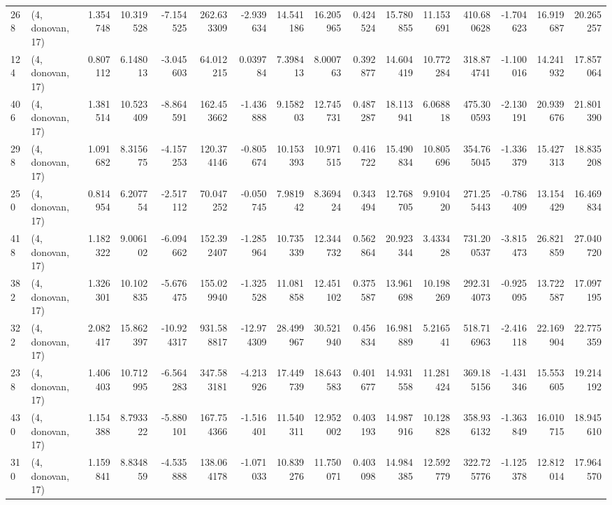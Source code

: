 \begin{tabular}{llrrrrrrrrrrrrrr}
268 &  (4, donovan, 17) &   1.354748 &  10.319528 &  -7.154525 &   262.633309 &  -2.939634 &  14.541186 &  16.205965 &  0.424524 &  15.780855 &  11.153691 &   410.680628 & -1.704623 &  16.919687 &  20.265257 \\
124 &  (4, donovan, 17) &   0.807112 &   6.148013 &  -3.045603 &    64.012215 &   0.039784 &   7.398413 &   8.000763 &  0.392877 &  14.604419 &  10.772284 &   318.874741 & -1.100016 &  14.241932 &  17.857064 \\
406 &  (4, donovan, 17) &   1.381514 &  10.523409 &  -8.864591 &   162.453662 &  -1.436888 &   9.158203 &  12.745731 &  0.487287 &  18.113941 &   6.068818 &   475.300593 & -2.130191 &  20.939676 &  21.801390 \\
298 &  (4, donovan, 17) &   1.091682 &   8.315675 &  -4.157253 &   120.374146 &  -0.805674 &  10.153393 &  10.971515 &  0.416722 &  15.490834 &  10.805696 &   354.765045 & -1.336379 &  15.427313 &  18.835208 \\
250 &  (4, donovan, 17) &   0.814954 &   6.207754 &  -2.517112 &    70.047252 &  -0.050745 &   7.981942 &   8.369424 &  0.343494 &  12.768705 &   9.910420 &   271.255443 & -0.786409 &  13.154429 &  16.469834 \\
418 &  (4, donovan, 17) &   1.182322 &   9.006102 &  -6.094662 &   152.392407 &  -1.285964 &  10.735339 &  12.344732 &  0.562864 &  20.923344 &   3.433428 &   731.200537 & -3.815473 &  26.821859 &  27.040720 \\
382 &  (4, donovan, 17) &   1.326301 &  10.102835 &  -5.676475 &   155.029940 &  -1.325528 &  11.081858 &  12.451102 &  0.375587 &  13.961698 &  10.198269 &   292.314073 & -0.925095 &  13.722587 &  17.097195 \\
322 &  (4, donovan, 17) &   2.082417 &  15.862397 & -10.924317 &   931.588817 & -12.974309 &  28.499967 &  30.521940 &  0.456834 &  16.981889 &   5.216541 &   518.716963 & -2.416118 &  22.169904 &  22.775359 \\
238 &  (4, donovan, 17) &   1.406403 &  10.712995 &  -6.564283 &   347.583181 &  -4.213926 &  17.449739 &  18.643583 &  0.401677 &  14.931558 &  11.281424 &   369.185156 & -1.431346 &  15.553605 &  19.214192 \\
430 &  (4, donovan, 17) &   1.154388 &   8.793322 &  -5.880101 &   167.754366 &  -1.516401 &  11.540311 &  12.952002 &  0.403193 &  14.987916 &  10.128828 &   358.936132 & -1.363849 &  16.010715 &  18.945610 \\
310 &  (4, donovan, 17) &   1.159841 &   8.834859 &  -4.535888 &   138.064178 &  -1.071033 &  10.839276 &  11.750071 &  0.403098 &  14.984385 &  12.592779 &   322.725776 & -1.125378 &  12.812014 &  17.964570 \\

\end{tabular}
